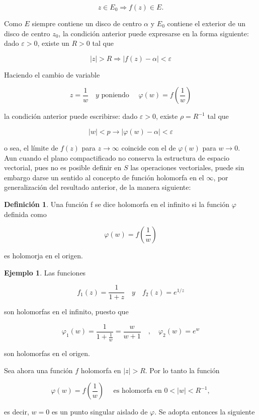 \documentclass[10pt]{article}
\theoremstyle{plain}
\theoremstyle{definition}
\newtheorem{definition}[theorem]{Definición}
\newtheorem{example}[theorem]{Ejemplo}
\theoremstyle{remark}
\begin{document}
$$
z \in E_{0} \Rightarrow f(z) \in E .
$$

Como $E$ siempre contiene un disco de centro $\alpha$ y $E_{0}$ contiene el exterior de un disco de centro $z_{0}$, la condición anterior puede expresarse en la forma siguiente: dado $\varepsilon>0$, existe un $R>0$ tal que

$$
|z|>R \Rightarrow|f(z)-\alpha|<\varepsilon
$$

Haciendo el cambio de variable

$$
z=\frac{1}{w} \quad y \text { poniendo } \quad \varphi(w)=f\left(\frac{1}{w}\right)
$$

la condición anterior puede escribirse: dado $\varepsilon>0$, existe $\rho=R^{-1}$ tal que

$$
|w|<p \rightarrow|\varphi(w)-\alpha|<\varepsilon
$$

o sea, el límite de $f(z)$ para $z \rightarrow \infty$ coincide con el de $\varphi(w)$ para $w \rightarrow 0$.\\
Aun cuando el plano compactificado no conserva la estructura de espacio vectorial, pues no es posible definir en $S$ las operaciones vectoriales, puede sin embargo darse un sentido al concepto de función holomorfa en el $\infty$, por generalización del resultado anterior, de la manera siguiente:

\begin{definition}
Una función f se dice holomorfa en el infinito si la función $\varphi$ definida como

$$
\varphi(w)=f\left(\frac{1}{w}\right)
$$

es holomorja en el origen.  
\end{definition}

\begin{example}
Las funciones

$$
f_{1}(z)=\frac{1}{1+z} \quad y \quad f_{2}(z)=e^{1 / z}
$$

son holomorfas en el infinito, puesto que

$$
\varphi_{1}(w)=\frac{1}{1+\frac{1}{w}}=\frac{w}{w+1} \quad, \quad \varphi_{2}(w)=e^{w}
$$

son holomorfas en el origen.  
\end{example}


Sea ahora una función $f$ holomorfa en $|z|>R$. Por lo tanto la función

$$
\varphi(w)=f\left(\frac{1}{w}\right) \quad \text { es holomorfa en } 0<|w|<R^{-1},
$$

es decir, $w=0$ es un punto singular aislado de $\varphi$. Se adopta entonces la siguiente
\end{document}

